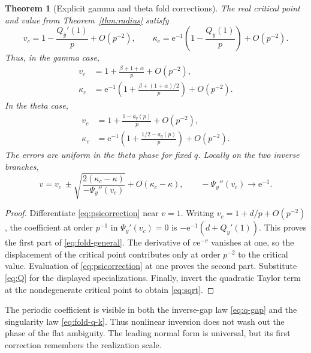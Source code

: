 \documentclass[11pt,a4paper]{article}
\numberwithin{equation}{section}
\newtheorem{theorem}{Theorem}[section]
\theoremstyle{definition}
\theoremstyle{remark}
\newcommand{\ee}{\mathrm e}
\begin{document}
\begin{theorem}[Explicit gamma and theta fold corrections]
\label{thm:fold-correction}
The real critical point and value from Theorem~\ref{thm:radius} satisfy
\begin{equation}
 v_c=1-\frac{Q_y'(1)}p+O(p^{-2}),\qquad
 \kappa_c=\ee^{-1}\left(1-\frac{Q_y(1)}p\right)+O(p^{-2}).
 \label{eq:fold-general}
\end{equation}
Thus, in the gamma case,
\begin{align}
 v_c&=1+\frac{\beta+1+\alpha}{p}+O(p^{-2}),\label{eq:fold-gamma-v}\\
 \kappa_c&=\ee^{-1}\left(1+\frac{\beta+(1+\alpha)/2}{p}\right)
                                          +O(p^{-2}).\label{eq:fold-gamma-k}
\end{align}
In the theta case,
\begin{align}
 v_c&=1+\frac{1-a_q(p)}p+O(p^{-2}),\label{eq:fold-q-v}\\
 \kappa_c&=\ee^{-1}\left(1+\frac{1/2-a_q(p)}p\right)
                                          +O(p^{-2}).\label{eq:fold-q-k}
\end{align}
The errors are uniform in the theta phase for fixed \(q\). Locally on
the two inverse branches,
\begin{equation}
 v=v_c\ \pm\sqrt{
      \frac{2(\kappa_c-\kappa)}{-\Psi_y''(v_c)}}
      +O(\kappa_c-\kappa),
 \qquad -\Psi_y''(v_c)\longrightarrow\ee^{-1}.
 \label{eq:sqrt}
\end{equation}
\end{theorem}
\begin{proof}
Differentiate \eqref{eq:psicorrection} near \(v=1\). Writing
\(v_c=1+d/p+O(p^{-2})\), the coefficient at order \(p^{-1}\) in
\(\Psi_y'(v_c)=0\) is \(-\ee^{-1}(d+Q_y'(1))\). This proves the first
part of \eqref{eq:fold-general}. The derivative of \(v\ee^{-v}\)
vanishes at one, so the displacement of the critical point contributes
only at order \(p^{-2}\) to the critical value. Evaluation of
\eqref{eq:psicorrection} at one proves the second part. Substitute
\eqref{eq:Q} for the displayed specializations. Finally, invert the
quadratic Taylor term at the nondegenerate critical point to obtain
\eqref{eq:sqrt}.
\end{proof}

The periodic coefficient is visible in both the inverse-gap law
\eqref{eq:q-gap} and the singularity law \eqref{eq:fold-q-k}.
Thus nonlinear inversion does not wash out the phase of the flat
ambiguity. The leading normal form is universal, but its first
correction remembers the realization scale.
\end{document}
